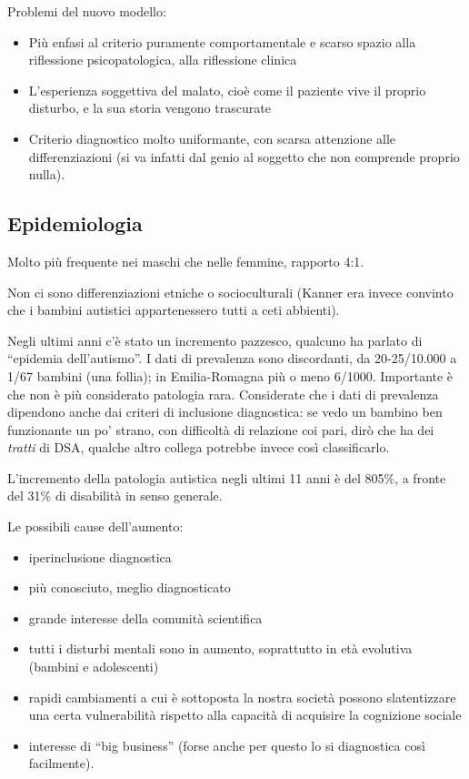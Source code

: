 Problemi del nuovo modello:

\begin{itemize}
\item
  Più enfasi al criterio puramente comportamentale e scarso spazio alla
  riflessione psicopatologica, alla riflessione clinica
\item
  L'esperienza soggettiva del malato, cioè come il paziente vive il
  proprio disturbo, e la sua storia vengono trascurate
\item
  Criterio diagnostico molto uniformante, con scarsa attenzione alle
  differenziazioni (si va infatti dal genio al soggetto che non
  comprende proprio nulla).
\end{itemize}

\subsection{Epidemiologia}

Molto più frequente nei maschi che nelle femmine, rapporto 4:1.

Non ci sono differenziazioni etniche o socioculturali (Kanner era invece
convinto che i bambini autistici appartenessero tutti a ceti abbienti).

Negli ultimi anni c'è stato un incremento pazzesco, qualcuno ha parlato
di ``epidemia dell'autismo''. I dati di prevalenza sono discordanti, da
20-25/10.000 a 1/67 bambini (una follia); in Emilia-Romagna più o meno
6/1000. Importante è che non è più considerato patologia rara.
Considerate che i dati di prevalenza dipendono anche dai criteri di
inclusione diagnostica: se vedo un bambino ben funzionante un po'
strano, con difficoltà di relazione coi pari, dirò che ha dei
\emph{tratti} di DSA, qualche altro collega potrebbe invece così
classificarlo.

L'incremento della patologia autistica negli ultimi 11 anni è del 805\%,
a fronte del 31\% di disabilità in senso generale.

Le possibili cause dell'aumento:

\begin{itemize}
\item
  iperinclusione diagnostica
\item
  più conosciuto, meglio diagnosticato
\item
  grande interesse della comunità scientifica
\item
  tutti i disturbi mentali sono in aumento, soprattutto in età evolutiva
  (bambini e adolescenti)
\item
  rapidi cambiamenti a cui è sottoposta la nostra società possono
  slatentizzare una certa vulnerabilità rispetto alla capacità di
  acquisire la cognizione sociale
\item
  interesse di ``big business'' (forse anche per questo lo si
  diagnostica così facilmente).
\end{itemize}

